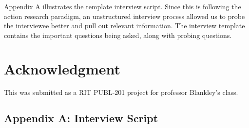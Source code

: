 \documentclass[12pt]{apa6}
\begin{document}
Appendix A illustrates the template interview script.
Since this is following the action research paradigm, an unstructured interview process allowed us to probe the interviewee better and pull out relevant information.
The interview template contains the important questions being asked, along with probing questions.

\section{Acknowledgment}

This was submitted as a RIT PUBL-201 project for professor Blankley's class.

\subsection{\label{appendix:interview}Appendix A: Interview Script}
\end{document}
